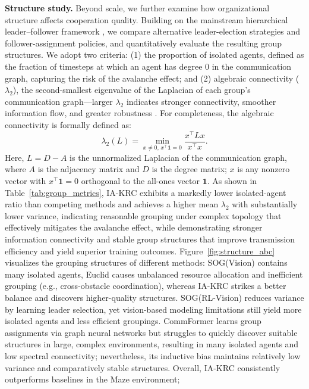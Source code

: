 \documentclass[10pt]{article} %
\begin{document}
\textbf{Structure study.} Beyond scale, we further examine how organizational structure affects cooperation quality. Building on the mainstream hierarchical leader–follower framework \citep{soni2018formation, sheng2022learning}, we compare alternative leader-election strategies and follower-assignment policies, and quantitatively evaluate the resulting group structures. We adopt two criteria: (1) the proportion of isolated agents, defined as the fraction of timesteps at which an agent has degree 0 in the communication graph, capturing the risk of the avalanche effect; and (2) algebraic connectivity (\( \lambda_{2} \)), the second-smallest eigenvalue of the Laplacian of each group's communication graph—larger \( \lambda_{2} \) indicates stronger connectivity, smoother information flow, and greater robustness \citep{fiedler1973algebraic, mohar1991laplacian}. For completeness, the algebraic connectivity is formally defined as:
\[
\lambda_{2}(L) = \min_{x \ne 0,\, x^{\top} \mathbf{1} = 0} \frac{x^{\top} L x}{x^{\top} x}.
\]
Here, \(L = D - A\) is the unnormalized Laplacian of the communication graph, where \(A\) is the adjacency matrix and \(D\) is the degree matrix; \(x\) is any nonzero vector with \(x^{\top}\mathbf{1}=0\) orthogonal to the all-ones vector \(\mathbf{1}\).
As shown in Table~\ref{tab:group_metrics}, IA-KRC exhibits a markedly lower isolated-agent ratio than competing methods and achieves a higher mean \(\lambda_2\) with substantially lower variance, indicating reasonable grouping under complex topology that effectively mitigates the avalanche effect, while demonstrating stronger information connectivity and stable group structures that improve transmission efficiency and yield superior training outcomes. Figure~\ref{fig:structure_abc} visualizes the grouping structures of different methods: SOG(Vision) contains many isolated agents, Euclid causes unbalanced resource allocation and inefficient grouping (e.g., cross-obstacle coordination), whereas IA-KRC strikes a better balance and discovers higher-quality structures. SOG(RL-Vision) reduces variance by learning leader selection, yet vision-based modeling limitations still yield more isolated agents and less efficient groupings. CommFormer learns group assignments via graph neural networks but struggles to quickly discover suitable structures in large, complex environments, resulting in many isolated agents and low spectral connectivity; nevertheless, its inductive bias maintains relatively low variance and comparatively stable structures. Overall, IA-KRC consistently outperforms baselines in the Maze environment;
\end{document}
